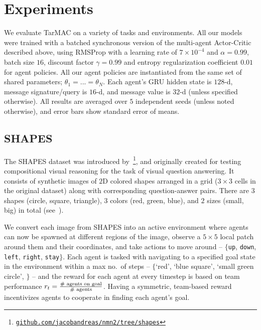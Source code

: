 \section{Experiments}
\label{sec:experiments}

We evaluate TarMAC on a variety of tasks and environments.
All our models were trained with a batched synchronous version of the multi-agent
Actor-Critic described above, using RMSProp with a learning rate of
$7\times 10^{-4}$ and $\alpha = 0.99$, batch size $16$, discount factor
$\gamma = 0.99$ and entropy regularization coefficient $0.01$ for agent policies.
All our agent policies are instantiated from the same set of shared parameters; \ie $\theta_1 = ... = \theta_N$.
Each agent's GRU hidden state is $128$-d, message signature/query is $16$-d, and message value is $32$-d (unless specified otherwise).
All results are averaged over $5$ independent seeds (unless noted otherwise),
and error bars show standard error of means.

\vspace{-5pt}
\subsection{SHAPES}
\label{sec:shapes}

The SHAPES dataset was introduced by~\citet{andreas_cvpr16}\footnote{\href{https://github.com/jacobandreas/nmn2/tree/shapes}{\texttt{github.com/jacobandreas/nmn2/tree/shapes}}}, and originally created
for testing compositional visual reasoning for the task of visual question answering.
It consists of synthetic images of $2$D colored shapes
arranged in a grid ($3 \times 3$ cells in the original dataset) along with corresponding
question-answer pairs.
There are $3$ shapes (circle, square, triangle), $3$ colors (red, green, blue),
and $2$ sizes (small, big) in total (see~).

We convert each image from SHAPES
into an active environment where agents can now be spawned at different regions of
the image, observe a $5 \times 5$ local patch around them and their coordinates, and take actions
to move around -- $\{$\texttt{up}, \texttt{down}, \texttt{left}, \texttt{right}, \texttt{stay}$\}$. Each agent is tasked with
navigating to a specified goal state in the environment within a max no.~of steps -- $\{$`red', `blue square',
`small green circle', \etc$\}$ -- and the reward for each agent at every timestep
is based on team performance \ie $r_t = \frac{\textnormal{\# agents on goal}}{\textnormal{\# agents}}$.
Having a symmetric, team-based reward incentivizes agents to cooperate
in finding each agent's goal.

